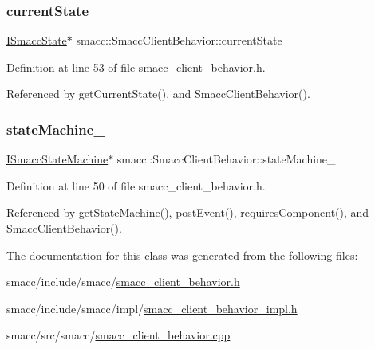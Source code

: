 \subsubsection{\texorpdfstring{current\+State}{currentState}}
{\footnotesize\ttfamily \hyperlink{classsmacc_1_1ISmaccState}{I\+Smacc\+State}$\ast$ smacc\+::\+Smacc\+Client\+Behavior\+::current\+State\hspace{0.3cm}{\ttfamily [private]}}



Definition at line 53 of file smacc\+\_\+client\+\_\+behavior.\+h.



Referenced by get\+Current\+State(), and Smacc\+Client\+Behavior().

\mbox{\label{classsmacc_1_1SmaccClientBehavior_a7950b5684d6de0a8e8959c0936ce9a19}} 
\subsubsection{\texorpdfstring{state\+Machine\+\_\+}{stateMachine\_}}
{\footnotesize\ttfamily \hyperlink{classsmacc_1_1ISmaccStateMachine}{I\+Smacc\+State\+Machine}$\ast$ smacc\+::\+Smacc\+Client\+Behavior\+::state\+Machine\+\_\+\hspace{0.3cm}{\ttfamily [private]}}



Definition at line 50 of file smacc\+\_\+client\+\_\+behavior.\+h.



Referenced by get\+State\+Machine(), post\+Event(), requires\+Component(), and Smacc\+Client\+Behavior().



The documentation for this class was generated from the following files\+:\begin{DoxyCompactItemize}
\item 
smacc/include/smacc/\hyperlink{smacc__client__behavior_8h}{smacc\+\_\+client\+\_\+behavior.\+h}\item 
smacc/include/smacc/impl/\hyperlink{smacc__client__behavior__impl_8h}{smacc\+\_\+client\+\_\+behavior\+\_\+impl.\+h}\item 
smacc/src/smacc/\hyperlink{smacc__client__behavior_8cpp}{smacc\+\_\+client\+\_\+behavior.\+cpp}\end{DoxyCompactItemize}
